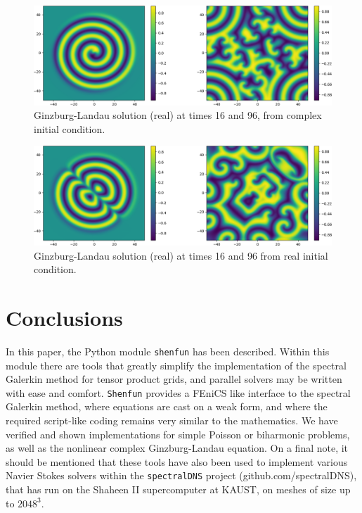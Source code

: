 \documentclass[%
oneside,                 %
final,                   %
10pt]{article}
\begin{document}
\begin{figure}[!ht]  %
  \centerline{\includegraphics[width=0.9\linewidth]{figs/Ginzburg_1.png}}
  \caption{
  Ginzburg-Landau solution (real) at times 16 and 96, from complex initial condition. \label{fig:GL1}
  }
\end{figure}



\begin{figure}[!ht]  %
  \centerline{\includegraphics[width=0.9\linewidth]{figs/Ginzburg.png}}
  \caption{
  Ginzburg-Landau solution (real) at times 16 and 96 from real initial condition. \label{fig:GL2}
  }
\end{figure}


\section{Conclusions}
In this paper, the Python module \texttt{shenfun} has been described. Within this module there are tools that greatly simplify the implementation of the spectral Galerkin method for tensor product grids, and parallel solvers may be written with ease and comfort.  \texttt{Shenfun} provides a FEniCS like interface to the spectral Galerkin method, where equations are cast on a weak form, and where the required script-like coding remains very similar to the mathematics. We have verified and shown implementations for simple Poisson or biharmonic problems, as well as the nonlinear complex Ginzburg-Landau equation. On a final note, it  should be mentioned that these tools have also been used to implement various Navier Stokes solvers within the \texttt{spectralDNS} project (github.com/spectralDNS), that has run on the Shaheen II supercomputer at KAUST, on meshes of size up to $2048^3$.
\end{document}
